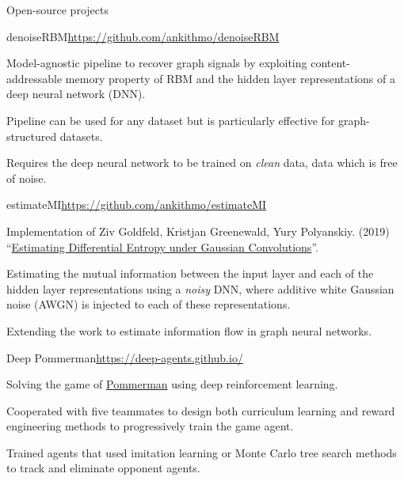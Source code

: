 \documentclass{resume} %
\begin{document}
\begin{rSection}{Open-source projects}

\begin{rSubsection}{denoiseRBM}{\url{https://github.com/ankithmo/denoiseRBM}}{}{}
\item Model-agnostic pipeline to recover graph signals by exploiting content-addressable memory property of RBM and the hidden layer representations of a deep neural network (DNN).
\item Pipeline can be used for any dataset but is particularly effective for graph-structured datasets.
\item Requires the deep neural network to be trained on \textit{clean} data, data which is free of noise.
\end{rSubsection}

\begin{rSubsection}{estimateMI}{\url{https://github.com/ankithmo/estimateMI}}{}{}
\item Implementation of Ziv Goldfeld, Kristjan Greenewald, Yury Polyanskiy. (2019) ``\href{https://arxiv.org/abs/1810.11589}{Estimating Differential Entropy under Gaussian Convolutions}''.
\item Estimating the mutual information between the input layer and each of the hidden layer representations using a {\em noisy} DNN, where additive white Gaussian noise (AWGN) is injected to each of these representations.
\item Extending the work to estimate information flow in graph neural networks.
\end{rSubsection}

\begin{rSubsection}{Deep Pommerman}{\url{https://deep-agents.github.io/}}{}{}
\item Solving the game of \href{https://www.pommerman.com/}{Pommerman} using deep reinforcement learning.
\item Cooperated with five teammates to design both curriculum learning and reward engineering methods to progressively train the game agent. 
\item Trained agents that used imitation learning or Monte Carlo tree search methods to track and eliminate opponent agents.
\end{rSubsection}

\end{rSection}
\end{document}
